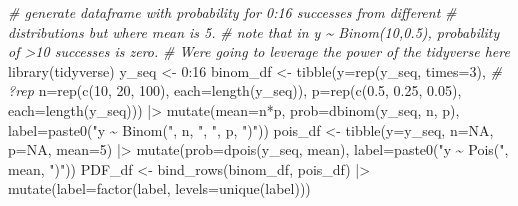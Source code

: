 \documentclass[
  11pt,
  a4paper,
]{book}
\newenvironment{Shaded}{\begin{snugshade}}{\end{snugshade}}
\newcommand{\AttributeTok}[1]{\textcolor[rgb]{0.77,0.63,0.00}{#1}}
\newcommand{\CommentTok}[1]{\textcolor[rgb]{0.56,0.35,0.01}{\textit{#1}}}
\newcommand{\ConstantTok}[1]{\textcolor[rgb]{0.00,0.00,0.00}{#1}}
\newcommand{\DecValTok}[1]{\textcolor[rgb]{0.00,0.00,0.81}{#1}}
\newcommand{\FloatTok}[1]{\textcolor[rgb]{0.00,0.00,0.81}{#1}}
\newcommand{\FunctionTok}[1]{\textcolor[rgb]{0.00,0.00,0.00}{#1}}
\newcommand{\NormalTok}[1]{#1}
\newcommand{\OtherTok}[1]{\textcolor[rgb]{0.56,0.35,0.01}{#1}}
\newcommand{\SpecialCharTok}[1]{\textcolor[rgb]{0.00,0.00,0.00}{#1}}
\newcommand{\StringTok}[1]{\textcolor[rgb]{0.31,0.60,0.02}{#1}}
\begin{document}
\begin{Shaded}
\begin{Highlighting}[]
\CommentTok{\# generate dataframe with probability for 0:16 \textquotesingle{}successes\textquotesingle{} from different }
\CommentTok{\# distributions but where mean is 5.}
\CommentTok{\# note that in y \textasciitilde{} Binom(10,0.5), probability of \textgreater{}10 successes is zero.}
\CommentTok{\# We\textquotesingle{}re going to leverage the power of the tidyverse here}
\FunctionTok{library}\NormalTok{(tidyverse)}
\NormalTok{y\_seq }\OtherTok{\textless{}{-}} \DecValTok{0}\SpecialCharTok{:}\DecValTok{16}
\NormalTok{binom\_df }\OtherTok{\textless{}{-}} \FunctionTok{tibble}\NormalTok{(}\AttributeTok{y=}\FunctionTok{rep}\NormalTok{(y\_seq, }\AttributeTok{times=}\DecValTok{3}\NormalTok{), }\CommentTok{\# ?rep}
                   \AttributeTok{n=}\FunctionTok{rep}\NormalTok{(}\FunctionTok{c}\NormalTok{(}\DecValTok{10}\NormalTok{, }\DecValTok{20}\NormalTok{, }\DecValTok{100}\NormalTok{), }\AttributeTok{each=}\FunctionTok{length}\NormalTok{(y\_seq)),}
                   \AttributeTok{p=}\FunctionTok{rep}\NormalTok{(}\FunctionTok{c}\NormalTok{(}\FloatTok{0.5}\NormalTok{, }\FloatTok{0.25}\NormalTok{, }\FloatTok{0.05}\NormalTok{), }\AttributeTok{each=}\FunctionTok{length}\NormalTok{(y\_seq))) }\SpecialCharTok{|\textgreater{}}
    \FunctionTok{mutate}\NormalTok{(}\AttributeTok{mean=}\NormalTok{n}\SpecialCharTok{*}\NormalTok{p,}
           \AttributeTok{prob=}\FunctionTok{dbinom}\NormalTok{(y\_seq, n, p),}
           \AttributeTok{label=}\FunctionTok{paste0}\NormalTok{(}\StringTok{"y \textasciitilde{} Binom("}\NormalTok{, n, }\StringTok{", "}\NormalTok{, p, }\StringTok{")"}\NormalTok{))}
\NormalTok{pois\_df }\OtherTok{\textless{}{-}} \FunctionTok{tibble}\NormalTok{(}\AttributeTok{y=}\NormalTok{y\_seq,}
                  \AttributeTok{n=}\ConstantTok{NA}\NormalTok{, }
                  \AttributeTok{p=}\ConstantTok{NA}\NormalTok{,}
                  \AttributeTok{mean=}\DecValTok{5}\NormalTok{) }\SpecialCharTok{|\textgreater{}}
    \FunctionTok{mutate}\NormalTok{(}\AttributeTok{prob=}\FunctionTok{dpois}\NormalTok{(y\_seq, mean),}
           \AttributeTok{label=}\FunctionTok{paste0}\NormalTok{(}\StringTok{"y \textasciitilde{} Pois("}\NormalTok{, mean, }\StringTok{")"}\NormalTok{))}
\NormalTok{PDF\_df }\OtherTok{\textless{}{-}} \FunctionTok{bind\_rows}\NormalTok{(binom\_df, pois\_df) }\SpecialCharTok{|\textgreater{}}
  \FunctionTok{mutate}\NormalTok{(}\AttributeTok{label=}\FunctionTok{factor}\NormalTok{(label, }\AttributeTok{levels=}\FunctionTok{unique}\NormalTok{(label)))}
\end{Highlighting}
\end{Shaded}
\end{document}
